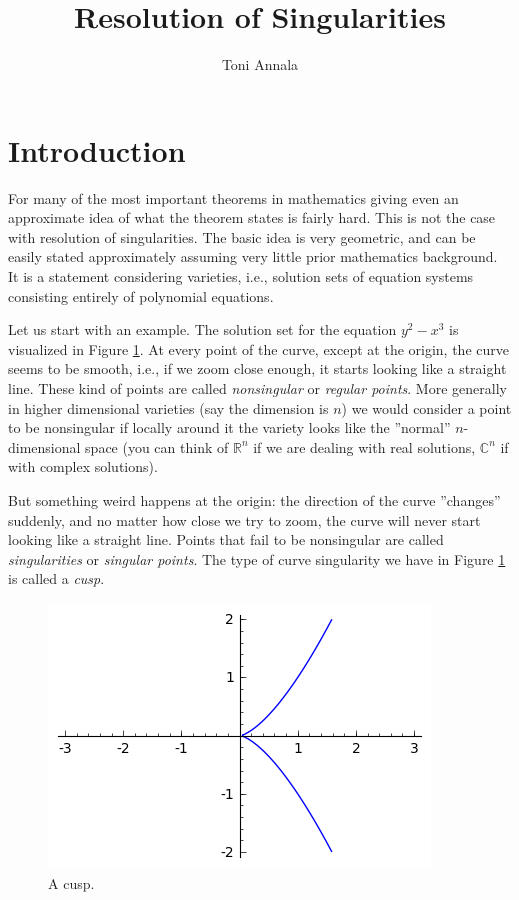 \documentclass[12pt,a4paper,leqno]{article}
\title{Resolution of Singularities}
\author{Toni Annala}
\date{}
\newcommand{\R}{\mathbb{R}}
\newcommand{\C}{\mathbb{C}}
\newcommand{\fref}[1]{\hyperref[{#1}]{\ref*{#1}}}
\theoremstyle{plain}
\theoremstyle{definition}
\theoremstyle{remark}
\begin{document}
\maketitle

\tableofcontents

\section{Introduction}

For many of the most important theorems in mathematics giving even an approximate idea of what the theorem states is fairly hard. This is not the case with resolution of singularities. The basic idea is very geometric, and can be easily stated approximately assuming very little prior mathematics background. It is a statement considering varieties, i.e., solution sets of equation systems consisting entirely of polynomial equations.

Let us start with an example. The solution set for the equation $y^2 - x^3$ is visualized in Figure \fref{cusp1}. At every point of the curve, except at the origin, the curve seems to be smooth, i.e., if we zoom close enough, it starts looking like a straight line. These kind of points are called \emph{nonsingular} or \emph{regular points}. More generally in higher dimensional varieties (say the dimension is $n$) we would consider a point to be nonsingular if locally around it the variety looks like the ''normal'' $n$-dimensional space (you can think of $\R^n$ if we are dealing with real solutions, $\C^n$ if with complex solutions).  

But something weird happens at the origin: the direction of the curve ''changes'' suddenly, and no matter how close we try to zoom, the curve will never start looking like a straight line. Points that fail to be nonsingular are called \emph{singularities} or \emph{singular points}. The type of curve singularity we have in Figure \fref{cusp1} is called a \emph{cusp}.

\begin{figure}\label{cusp1}
\begin{center}
\includegraphics{pics/cusp.png}
\caption{A cusp.}
\end{center}
\end{figure}
\end{document}
